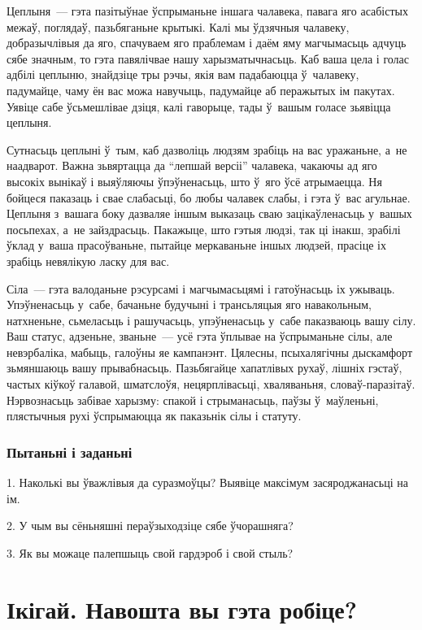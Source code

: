 Цеплыня~--- гэта пазітыўнае ўспрыманьне іншага чалавека, павага яго асабістых межаў, поглядаў, пазьбяганьне крытыкі. Калі мы ўдзячныя чалавеку, добразычлівыя да яго, спачуваем яго праблемам і даём яму магчымасьць адчуць сябе значным, то гэта павялічвае нашу харызматычнасьць. Каб ваша цела і голас адбілі цеплыню, знайдзіце тры рэчы, якія вам падабаюцца ў~чалавеку, падумайце, чаму ён вас можа навучыць, падумайце аб перажытых ім пакутах. Уявіце сабе ўсьмешлівае дзіця, калі гаворыце, тады ў~вашым голасе зьявіцца цеплыня.

Сутнасьць цеплыні ў~тым, каб дазволіць людзям зрабіць на вас уражаньне, а~не наадварот. Важна зьвяртацца да ``лепшай версіі'' чалавека, чакаючы ад яго высокіх вынікаў і выяўляючы ўпэўненасьць, што ў~яго ўсё атрымаецца. Ня бойцеся паказаць і свае слабасьці, бо любы чалавек слабы, і гэта ў~вас агульнае. Цеплыня з~вашага боку дазваляе іншым выказаць сваю зацікаўленасьць у~вашых посьпехах, а~не зайздрасьць. Пакажыце, што гэтыя людзі, так ці інакш, зрабілі ўклад у~ваша прасоўваньне, пытайце меркаваньне іншых людзей, прасіце іх зрабіць невялікую ласку для вас.

Сіла~--- гэта валоданьне рэсурсамі і магчымасьцямі і гатоўнасьць іх ужываць. Упэўненасьць у~сабе, бачаньне будучыні і трансьляцыя яго навакольным, натхненьне, сьмеласьць і рашучасьць, упэўненасьць у~сабе паказваюць вашу сілу. Ваш статус, адзеньне, званьне~--- усё гэта ўплывае на ўспрыманьне сілы, але невэрбаліка, мабыць, галоўны яе кампанэнт. Цялесны, псыхалягічны дыскамфорт зьмяншаюць вашу прывабнасьць. Пазьбягайце хапатлівых рухаў, лішніх гэстаў, частых кіўкоў галавой, шматслоўя, нецярплівасьці, хваляваньня, словаў-паразітаў. Нэрвознасьць забівае харызму: спакой і стрыманасьць, паўзы ў~маўленьні, плястычныя рухі ўспрымаюцца як паказьнік сілы і статуту.

\subsubsection{Пытаньні і заданьні}

1. Наколькі вы ўважлівыя да суразмоўцы? Выявіце максімум засяроджанасьці на ім.

2. У чым вы сёньняшні пераўзыходзіце сябе ўчорашняга?

3. Як вы можаце палепшыць свой гардэроб і свой стыль?


\section{Ікігай. Навошта вы гэта робіце?}


